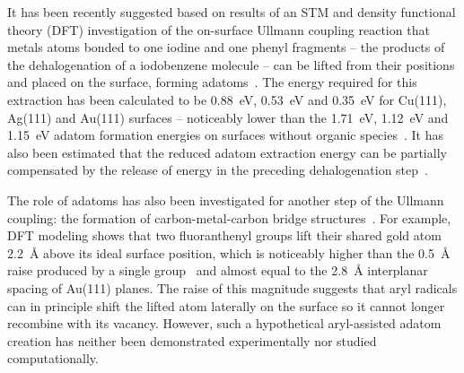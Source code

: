 \documentclass[aps,prb,amsmath,amssymb,11pt]{revtex4-1}
\newcommand{\zhzh}{\color{black}}
\renewcommand{\sout}[1]{\unskip}
\begin{document}
It has been recently suggested based on results of an STM and density functional theory (DFT) investigation of the on-surface Ullmann coupling reaction that metals atoms bonded to one iodine and one phenyl fragments -- the products of the dehalogenation of a iodobenzene molecule -- can be lifted from their \sout{ideal-surface} positions and placed \sout{onto} {\zhzh on} the surface{\zhzh , forming adatoms}~\cite{chemeurope2017}. 
The energy required for this extraction has been calculated to be \SI{0.88}{\electronvolt}, \SI{0.53}{\electronvolt} and \SI{0.35}{\electronvolt} for Cu(111), Ag(111) and Au(111) surfaces -- noticeably lower than the \SI{1.71}{\electronvolt}, \SI{1.12}{\electronvolt} and \SI{1.15}{\electronvolt} \sout{extraction} {\zhzh adatom formation} energies on \sout{clean surfaces} {\zhzh surfaces without organic species}~\cite{chemeurope2017}. %
%
It has also been estimated that the reduced adatom extraction energy can be partially compensated by the release of energy in the preceding dehalogenation step~\cite{chemeurope2017}. %

The role of adatoms has also been investigated for another step of the Ullmann coupling: the formation of carbon-metal-carbon bridge structures~\cite{acsnano2017, jpcc2018, acsnano2019}. 
For example, DFT modeling shows that two fluoranthenyl groups lift their shared gold atom \SI{2.2}{\angstrom} above its ideal surface position, which is noticeably higher than the \SI{0.5}{\angstrom} raise produced by a single group~\cite{jpcc2018} and almost equal to the 
\SI{2.8}{\angstrom} interplanar spacing of Au(111) planes.
The raise of this magnitude suggests that aryl radicals \sout{might} {\zhzh can} in principle shift the lifted atom laterally on the surface so it cannot longer recombine with its vacancy. However, such a hypothetical aryl-assisted adatom creation has neither been demonstrated experimentally nor studied computationally.
\end{document}
